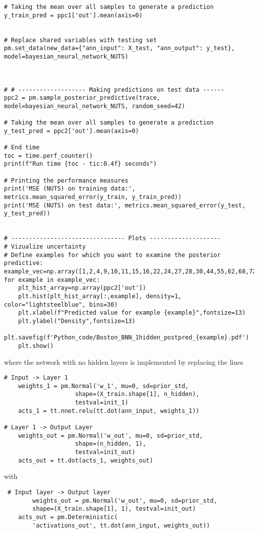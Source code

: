 \begin{appendices}
\begin{lstlisting}
# Taking the mean over all samples to generate a prediction
y_train_pred = ppc1['out'].mean(axis=0)


# Replace shared variables with testing set
pm.set_data(new_data={"ann_input": X_test, "ann_output": y_test}, model=bayesian_neural_network_NUTS)



# # ------------------- Making predictions on test data ------
ppc2 = pm.sample_posterior_predictive(trace, model=bayesian_neural_network_NUTS, random_seed=42)

# Taking the mean over all samples to generate a prediction
y_test_pred = ppc2['out'].mean(axis=0)

# End time
toc = time.perf_counter()
print(f"Run time {toc - tic:0.4f} seconds")

# Printing the performance measures
print('MSE (NUTS) on training data:', metrics.mean_squared_error(y_train, y_train_pred))
print('MSE (NUTS) on test data:', metrics.mean_squared_error(y_test, y_test_pred))


# -------------------------------- Plots --------------------
# Vizualize uncertainty
# Define examples for which you want to examine the posterior predictive:
example_vec=np.array([1,2,4,9,10,11,15,16,22,24,27,28,30,44,55,62,68,72,84,93])
for example in example_vec:
    plt_hist_array=np.array(ppc2['out'])
    plt.hist(plt_hist_array[:,example], density=1, color="lightsteelblue", bins=30)
    plt.xlabel(f"Predicted value for example {example}",fontsize=13)
    plt.ylabel("Density",fontsize=13)
    plt.savefig(f'Python_code/Boston_BNN_1hidden_postpred_{example}.pdf')
    plt.show()
\end{lstlisting}
where the network with no hidden layers is implemented by replacing the lines
\begin{lstlisting}
# Input -> Layer 1
    weights_1 = pm.Normal('w_1', mu=0, sd=prior_std,
                    shape=(X_train.shape[1], n_hidden),
                    testval=init_1)
    acts_1 = tt.nnet.relu(tt.dot(ann_input, weights_1))

# Layer 1 -> Output Layer
    weights_out = pm.Normal('w_out', mu=0, sd=prior_std,
                    shape=(n_hidden, 1),
                    testval=init_out)
    acts_out = tt.dot(acts_1, weights_out)
\end{lstlisting}
with
\begin{lstlisting}
 # Input layer -> Output layer
        weights_out = pm.Normal('w_out', mu=0, sd=prior_std,
        shape=(X_train.shape[1], 1), testval=init_out)
    acts_out = pm.Deterministic(
        'activations_out', tt.dot(ann_input, weights_out))
\end{lstlisting}



\end{appendices}
